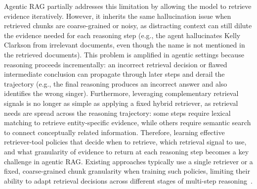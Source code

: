 \documentclass[11pt]{article}
\begin{document}
Agentic RAG partially addresses this limitation by allowing the model to retrieve evidence iteratively. However, it inherits the same hallucination issue when retrieved chunks are coarse-grained or noisy, as distracting context can still dilute the evidence needed for each reasoning step (e.g., the agent hallucinates Kelly Clarkson from irrelevant documents, even though the name is not mentioned in the retrieved documents). This problem is amplified in agentic settings because reasoning proceeds incrementally: an incorrect retrieval decision or flawed intermediate conclusion can propagate through later steps and derail the trajectory (e.g., the final reasoning produces an incorrect answer and also identifies the wrong singer). 
%
Furthermore, leveraging complementary retrieval signals is no longer as simple as applying a fixed hybrid retriever, as retrieval needs are spread across the reasoning trajectory: some steps require lexical matching to retrieve entity-specific evidence, while others require semantic search to connect conceptually related information. Therefore, learning effective retriever-tool policies that decide when to retrieve, which retrieval signal to use, and what granularity of evidence to return at each reasoning step becomes a key challenge in agentic RAG. Existing approaches typically use a single retriever or a fixed, coarse-grained chunk granularity when training such policies, limiting their ability to adapt retrieval decisions across different stages of multi-step reasoning~\cite{jin2025search,luo2025marag}.
%
\end{document}

